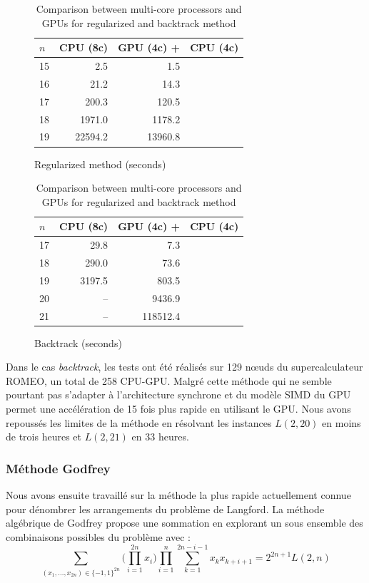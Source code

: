 \documentclass[12pt,a4paper]{report}
\begin{document}
\begin{table}[t!]
\begin{subfigure}[b]{0.5\linewidth}
\centering
\begin{tabular}{l r r r}
					\hline
					$n$ & CPU (8c) &  GPU (4c) +  &  \hspace*{-.8em}CPU (4c) \\
					\hline
					\hline
					15	& 2.5 & 1.5 & \\
					16  & 21.2 &14.3 & \\
					17  & 200.3 &120.5 &\\
					18  & 1971.0 &1178.2 &\\
					19  & 22594.2 & 13960.8 & \\ 
					\hline
\end{tabular}
\caption{Regularized method (seconds)}
\label{tab:result_base_regu}
\end{subfigure}
\begin{subfigure}[b]{0.5\linewidth}
\centering
\begin{tabular}{ l r r r }
					\hline
					$n$ & CPU (8c) &  GPU (4c) +  &  \hspace*{-.8em}CPU (4c) \\
					\hline
					\hline
					17  & 29.8 & 7.3&\\
					18  & 290.0 & 73.6&\\
					19  & 3197.5 & 803.5& \\
					20  & -- & 9436.9 &\\
					21  & -- & 118512.4& \\ 
					\hline
\end{tabular}	
\caption{Backtrack  (seconds)}
\label{tab:result_backtrack}
\end{subfigure}
\caption{Comparison between multi-core processors and GPUs for regularized and backtrack method}
\end{table}

Dans le cas \textit{backtrack}, les tests ont été réalisés sur 129 nœuds du supercalculateur ROMEO, un total de 258 CPU-GPU. 
Malgré cette méthode qui ne semble pourtant pas s'adapter à l'architecture synchrone et du modèle SIMD du GPU permet une accélération de 15 fois plus rapide en utilisant le GPU. 
Nous avons repoussés les limites de la méthode en résolvant les instances $L(2,20)$ en moins de trois heures et $L(2,21)$ en 33 heures.

\subsubsection{Méthode Godfrey}
Nous avons ensuite travaillé sur la méthode la plus rapide actuellement connue pour dénombrer les arrangements du problème de Langford. 
La méthode algébrique de Godfrey propose une sommation en explorant un sous ensemble des combinaisons possibles du problème avec : 
\begin{equation}
\sum\limits_{(x_1,...,x_{2n}) \in \{-1,1\}^{2n}} \big( \prod\limits_{i=1}^{2n} x_i \big) \prod\limits_{i=1}^{n} \sum\limits_{k=1}^{2n-i-1} x_kx_{k+i+1} = 2^{2n+1} L(2,n)
\end{equation}
\end{document}
